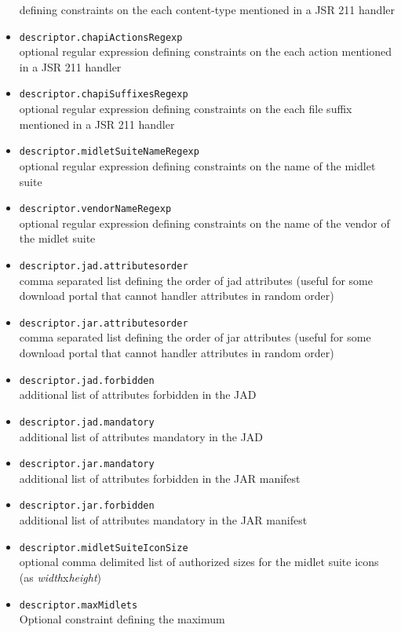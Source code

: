 \begin{itemize}
 defining constraints on the each content-type mentioned in a JSR 211 handler 
\item{\texttt{descriptor.chapiActionsRegexp}}\\optional regular expression
 defining constraints on the each action mentioned in a JSR 211 handler
\item{\texttt{descriptor.chapiSuffixesRegexp}}\\optional regular expression
 defining constraints on the each file suffix mentioned in a JSR 211 handler
\item{\texttt{descriptor.midletSuiteNameRegexp}}\\optional regular expression
 defining constraints on the name of the midlet suite
\item{\texttt{descriptor.vendorNameRegexp}}\\optional regular expression
 defining constraints on the name of the vendor of the midlet suite
\item{\texttt{descriptor.jad.attributesorder}}\\comma separated list defining
 the order of jad attributes (useful for some download portal that cannot
 handler attributes in random order)
\item{\texttt{descriptor.jar.attributesorder}}\\comma separated list defining
 the order of jar attributes (useful for some download portal that cannot
 handler attributes in random order)
\item{\texttt{descriptor.jad.forbidden}}\\ additional list of attributes
 forbidden in the JAD
\item{\texttt{descriptor.jad.mandatory}}\\ additional list of attributes 
 mandatory in the JAD
\item{\texttt{descriptor.jar.mandatory}}\\ additional list of attributes
 forbidden in the JAR manifest
\item{\texttt{descriptor.jar.forbidden}}\\ additional list of attributes
 mandatory in the JAR manifest
\item{\texttt{descriptor.midletSuiteIconSize}}\\optional comma delimited list of
 authorized sizes for the midlet suite icons (as \textit{width}x\textit{height})
\item{\texttt{descriptor.maxMidlets}}\\ Optional constraint defining the maximum

\end{itemize}

